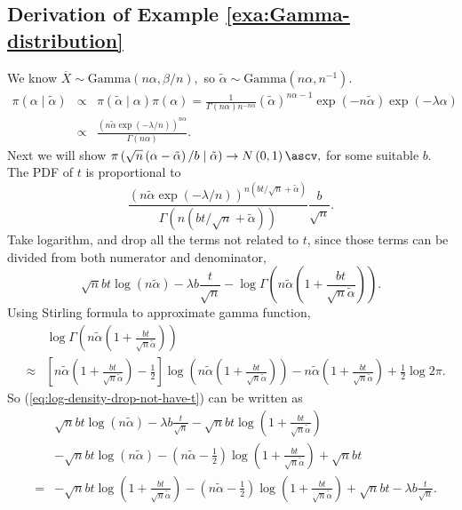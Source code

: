 \subsection{\label{sub:Derivation-of-Example-2}Derivation of Example \ref{exa:Gamma-distribution}}

We know $\overline{X}\sim\mathrm{Gamma}\left(n\alpha,\beta/n\right),$
so $\tilde{\alpha}\sim\mathrm{Gamma}\left(n\alpha,n^{-1}\right).$
\begin{eqnarray*}
\pi\left(\alpha\mid\tilde{\alpha}\right) & \propto & \pi\left(\tilde{\alpha}\mid\alpha\right)\pi\left(\alpha\right)=\frac{1}{\Gamma\left(n\alpha\right)n^{-n\alpha}}\left(\tilde{\alpha}\right)^{n\alpha-1}\exp\left(-n\tilde{\alpha}\right)\exp\left(-\lambda\alpha\right)\\
 & \propto & \frac{\left(n\tilde{\alpha}\exp\left(-\lambda/n\right)\right)^{n\alpha}}{\Gamma\left(n\alpha\right)}.
\end{eqnarray*}
Next we will show $\pi\left(\sqrt{n}\left(\alpha-\tilde{\alpha}\right)/b\mid\tilde{\alpha}\right)\rightarrow N\left(0,1\right)\ascv,$
for some suitable $b$. The PDF of $t$ is proportional to 
\[
\frac{\left(n\tilde{\alpha}\exp\left(-\lambda/n\right)\right)^{n\left(bt/\sqrt{n}+\tilde{\alpha}\right)}}{\Gamma\left(n\left(bt/\sqrt{n}+\tilde{\alpha}\right)\right)}\frac{b}{\sqrt{n}}.
\]
Take logarithm, and drop all the terms not related to $t$, since
those terms can be divided from both numerator and denominator, 
\begin{equation}
\sqrt{n}bt\log\left(n\tilde{\alpha}\right)-\lambda b\frac{t}{\sqrt{n}}-\log\Gamma\left(n\tilde{\alpha}\left(1+\frac{bt}{\sqrt{n}\tilde{\alpha}}\right)\right).\label{eq:log-density-drop-not-have-t}
\end{equation}
Using Stirling formula to approximate gamma function, 
\begin{eqnarray*}
 &  & \log\Gamma\left(n\tilde{\alpha}\left(1+\frac{bt}{\sqrt{n}\tilde{\alpha}}\right)\right)\\
 & \approx & \left[n\tilde{\alpha}\left(1+\frac{bt}{\sqrt{n}\tilde{\alpha}}\right)-\frac{1}{2}\right]\log\left(n\tilde{\alpha}\left(1+\frac{bt}{\sqrt{n}\tilde{\alpha}}\right)\right)-n\tilde{\alpha}\left(1+\frac{bt}{\sqrt{n}\tilde{\alpha}}\right)+\frac{1}{2}\log2\pi.
\end{eqnarray*}
So (\ref{eq:log-density-drop-not-have-t}) can be written as 
\begin{eqnarray}
 &  & \sqrt{n}bt\log\left(n\tilde{\alpha}\right)-\lambda b\frac{t}{\sqrt{n}}-\sqrt{n}bt\log\left(1+\frac{bt}{\sqrt{n}\tilde{\alpha}}\right)\nonumber \\
 &  & -\sqrt{n}bt\log\left(n\tilde{\alpha}\right)-\left(n\tilde{\alpha}-\frac{1}{2}\right)\log\left(1+\frac{bt}{\sqrt{n}\tilde{\alpha}}\right)+\sqrt{n}bt\nonumber \\
 & = & -\sqrt{n}bt\log\left(1+\frac{bt}{\sqrt{n}\tilde{\alpha}}\right)-\left(n\tilde{\alpha}-\frac{1}{2}\right)\log\left(1+\frac{bt}{\sqrt{n}\tilde{\alpha}}\right)+\sqrt{n}bt-\lambda b\frac{t}{\sqrt{n}}.\label{eq:log-density-after-stirling}
\end{eqnarray}
